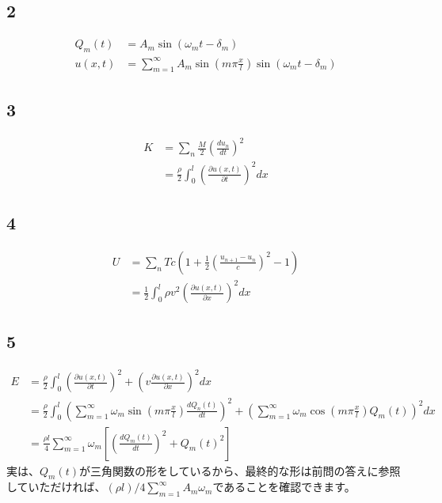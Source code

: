 \documentclass{jreport}
\begin{document}
\subsection{2}
\begin{equation}
	\begin{aligned}
		Q_m(t) &= A_m \sin(\omega_m t - \delta_m)\\
		u(x,t) &= \sum_{m=1}^{\infty} A_m \sin (m \pi \frac{x}{l} ) \sin(\omega_m t - \delta_m)
	\end{aligned}
\end{equation}
\subsection{3}
\begin{equation}
	\begin{aligned}
		K&=\sum_n \frac{M}{2}\left(\frac{du_n}{dt}\right)^2\\
		 &=\frac{\rho}{2} \int_0^l \left( \frac{\partial u(x,t)}{\partial t} \right) ^2dx
	\end{aligned}
\end{equation}
\subsection{4}
\begin{equation}
	\begin{aligned}
		U &= \sum_n Tc \left( 1 + \frac{1}{2} \left( \frac{u_{n+1} - u_n }{c} \right) ^2 -1 \right) \\
		  &= \frac{1}{2}\int_0^l \rho v^2 \left( \frac{\partial u(x,t) }{\partial x} \right)^2 dx
	\end{aligned}
\end{equation}
\subsection{5}
\begin{equation}
	\begin{aligned}
		E&=\frac{\rho}{2} \int_0^l \left( \frac{\partial u(x,t)}{\partial t} \right)^2 +\left( v\frac{\partial u(x,t)}{\partial x} \right)^2 dx\\
		 &=\frac{\rho}{2} \int_0^l \left(\sum_{m=1}^{\infty} \omega_m \sin(m\pi \frac{x}{l} )\frac{dQ_n(t)}{dt} \right)^2 + \left( \sum_{m=1}^{\infty} \omega_m \cos(m\pi \frac{x}{l} )Q_m(t)\right) ^2 dx \\
		 &=\frac{\rho l}{4} \sum_{m=1}^{\infty} \omega_m \left[ \left(\frac{dQ_m(t)}{dt}\right)^2 +Q_m(t)^2 \right]
	\end{aligned}
\end{equation}
実は、$Q_m(t)$が三角関数の形をしているから、最終的な形は前問の答えに参照していただければ、$(\rho l)/4\sum_{m=1}^{\infty} A_m \omega_m$であることを確認できます。
\newpage
\end{document}
